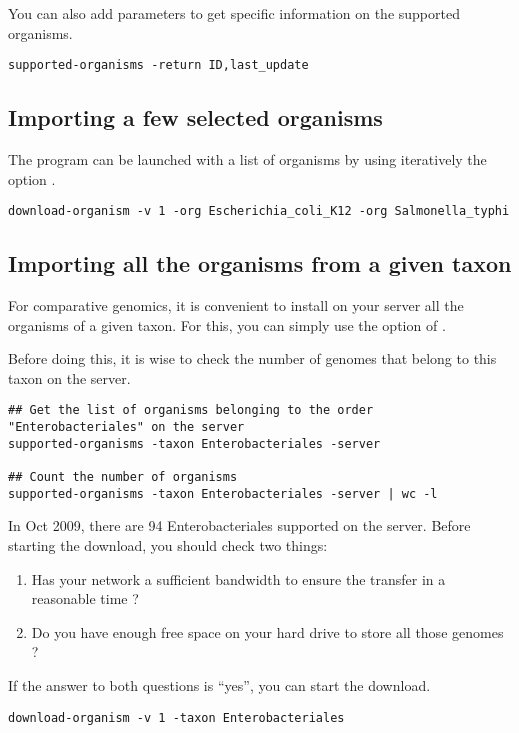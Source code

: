 
You can also add parameters to get specific information on the
supported organisms.

\begin{footnotesize}
\begin{verbatim}
supported-organisms -return ID,last_update
\end{verbatim}
\end{footnotesize}


\subsection{Importing a few selected organisms}

The program  can be launched with a list of
organisms by using iteratively the option .


\begin{footnotesize}
\begin{verbatim}
download-organism -v 1 -org Escherichia_coli_K12 -org Salmonella_typhi
\end{verbatim}
\end{footnotesize}

\subsection{Importing all the organisms from a given taxon}

For comparative genomics, it is convenient to install on your server
all the organisms of a given taxon. For this, you can simply use the
option  of .

Before doing this, it is wise to check the number of genomes that
belong to this taxon on the server.

\begin{footnotesize}
\begin{verbatim}
## Get the list of organisms belonging to the order "Enterobacteriales" on the server
supported-organisms -taxon Enterobacteriales -server

## Count the number of organisms
supported-organisms -taxon Enterobacteriales -server | wc -l
\end{verbatim}
\end{footnotesize}

In Oct 2009, there are 94 Enterobacteriales supported on the \RSAT
server. Before starting the download, you should check two things:
\begin{enumerate}
\item Has your network a sufficient bandwidth to ensure the transfer
  in a reasonable time ?
\item Do you have enough free space on your hard drive to store all those genomes ? 
\end{enumerate}

If the answer to both questions is ``yes'', you can start the
download.

\begin{footnotesize}
\begin{verbatim}
download-organism -v 1 -taxon Enterobacteriales 
\end{verbatim}
\end{footnotesize}
